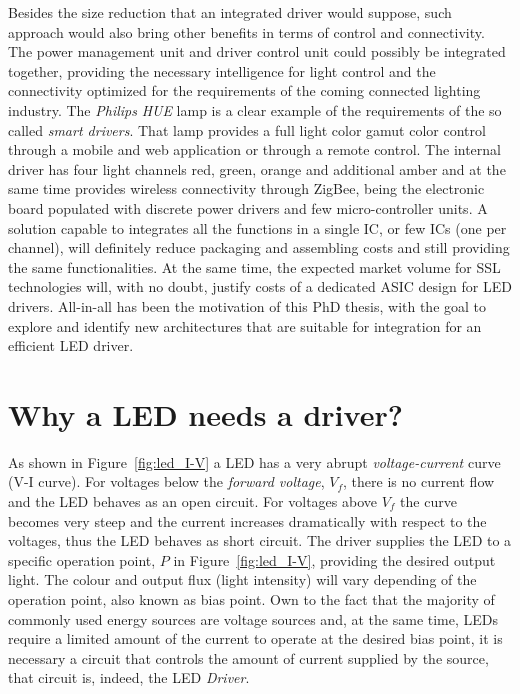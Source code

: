 Besides the size reduction that an integrated driver would suppose, such approach would also bring other benefits in terms of control and connectivity.  The power management unit and driver control unit could possibly be integrated together, providing the necessary intelligence for light control and the connectivity optimized for the requirements of the coming connected lighting industry. The \emph{Philips} \emph{HUE} lamp is a clear example of the requirements of the so called \emph{smart drivers}. That lamp provides a full light color gamut color control through a mobile and web application or through a remote control. The internal driver has four light channels red, green, orange and additional amber and at the same time provides wireless connectivity through ZigBee, being the electronic board populated with discrete power drivers and few micro-controller units. A solution capable to integrates all the functions in a single IC, or few ICs (one per channel), will definitely reduce packaging and assembling costs and still providing the same functionalities. At the same time, the expected market volume for SSL technologies will, with no doubt,  justify costs of a dedicated ASIC design for LED drivers. All-in-all has been the motivation of this PhD thesis, with  the goal to explore and identify new architectures that are suitable for integration for an efficient LED driver.



\section{Why a LED needs a driver?}

As shown in Figure~\ref{fig:led_I-V} a LED has a very abrupt \emph{voltage-current} curve (V-I curve). For voltages below the \emph{forward voltage}, $V_{f}$, there is no current flow and the LED behaves as an open circuit. For voltages above $V_{f}$ the curve becomes very steep and the current increases dramatically with respect to the voltages, thus the LED behaves as short circuit. The driver supplies the LED to a specific operation point, $P$ in Figure~\ref{fig:led_I-V}, providing the desired output light. The colour and output flux (light intensity) will vary depending of the operation point, also known as bias point.  Own to the fact that the majority of commonly used energy sources are voltage sources and, at the same time, LEDs require a limited amount of the current to operate at the desired bias point, it is necessary a circuit that controls the amount of current supplied by the source, that circuit is, indeed, the LED \emph{Driver}.


